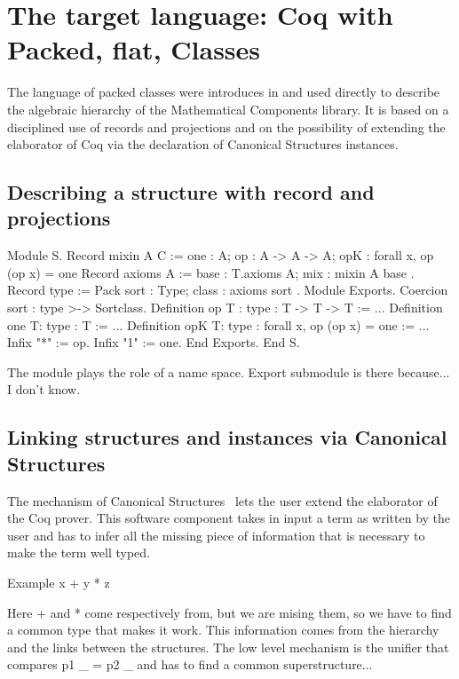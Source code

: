 \documentclass[a4paper,UKenglish,cleveref, autoref]{lipics-v2019}
\theoremstyle{implem}
\theoremstyle{implem}
\theoremstyle{axiom}
\theoremstyle{abscommand}
\theoremstyle{command}
\begin{document}
\section{The target language: Coq with Packed, flat, Classes}
\label{sec:target-lang}

The language of packed classes were introduces in
\cite{DBLP:conf/tphol/GarillotGMR09} and used directly to describe the
algebraic hierarchy of the Mathematical Components library.
It is based on a disciplined use of records and projections and
on the possibility of extending the elaborator of Coq
via the declaration of Canonical Structures instances.

\subsection{Describing a structure with record and projections}

\begin{coqcode}
Module S.
  Record mixin A C := {
    one : A;
    op : A -> A -> A;
    opK : forall x, op (op x) = one
  }
  Record axioms A := {
    base : T.axioms A;
    mix  : mixin A base
  }.
  Record type := Pack {
    sort : Type;
    class : axioms sort
  }.
  Module Exports.
    Coercion sort : type >-> Sortclass.
    Definition op {T : type} : T -> T -> T := ...
    Definition one {T:  type} : T := ...
    Definition opK {T:  type} : forall x, op (op x) = one := ...
    Infix "*" := op.
    Infix "1" := one.
  End Exports.
End S.
\end{coqcode}

The module plays the role of a name space.
Export submodule is there because... I don't know.

\subsection{Linking structures and instances via Canonical Structures}

The mechanism of Canonical Structures~\cite{DBLP:conf/itp/MahboubiT13}
lets the user extend the elaborator of the Coq prover. This software component
takes in input a term as written by the user and has to infer all the missing
piece of information that is necessary to make the term well typed.

Example x + y * z

Here + and * come respectively from, but we are mising them, so we have
to find a common type that makes it work. This information comes from
the hierarchy and the links between the structures. The low level mechanism
is the unifier that compares p1 \_ = p2 \_ and has to find a common
superstructure...
\end{document}
